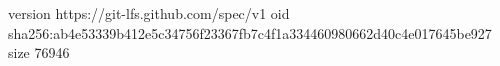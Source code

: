version https://git-lfs.github.com/spec/v1
oid sha256:ab4e53339b412e5c34756f23367fb7c4f1a334460980662d40c4e017645be927
size 76946

